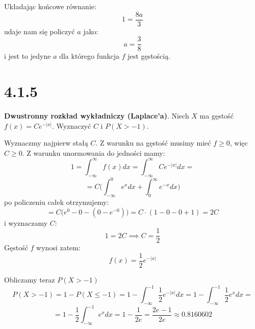 \documentclass{article}
\begin{document}
Układając końcowe równanie:
\begin{equation*}
    1 = \frac{8a}{3}
\end{equation*}
udaje nam się policzyć \(a\) jako:
\begin{equation*}
    a = \frac{3}{8}
\end{equation*}
i jest to jedyne \(a\) dla którego funkcja \(f\) jest gęstością.

\section*{4.1.5}
\begin{center}
    \textbf{Dwustronny rozkład wykładniczy (Laplace'a)}. Niech \(X\) ma gęstość \(f(x) = Ce^{-|x|}\).
    Wyznaczyć \(C\) i \(P(X > -1)\).
\end{center}
Wyznaczmy najpierw stałą \(C\). Z warunku na gęstość musimy mieć \(f \geq 0\), więc \(C \geq 0\). Z warunku unormowania do jedności mamy:
\begin{equation*}
    1 = \int_{-\infty}^{\infty} f(x)dx = \int_{-\infty}^{\infty} Ce^{-|x|} dx = 
\end{equation*}
\begin{equation*}
    = C \Big(\int_{-\infty}^{0} e^{x} dx + \int_{0}^{\infty} e^{-x} dx\Big)
\end{equation*}
po policzeniu całek otrzymujemy:
\begin{equation*}
    = C \Big(e^0 - 0 - (0 - e^{-0})\Big) = C \cdot (1 - 0 - 0 + 1) = 2C
\end{equation*}
i wyznaczamy \(C\):
\begin{equation*}
    1 = 2C \implies C = \frac{1}{2}
\end{equation*}
Gęstość \(f\) wynosi zatem:
\begin{equation*}
    f(x) = \frac{1}{2}e^{-|x|}
\end{equation*}
\par Obliczamy teraz \(P(X > -1)\)
\begin{equation*}
    P(X > -1) = 1 - P(X \leq -1) = 1 - \int_{-\infty}^{-1} \frac{1}{2}e^{-|x|} dx = 1 - \int_{-\infty}^{-1} \frac{1}{2}e^{x} dx = 
\end{equation*}
\begin{equation*}
    = 1 - \frac{1}{2} \int_{-\infty}^{-1} e^{x} dx = 1 - \frac{1}{2e} = \frac{2e - 1}{2e} \approx 0.8160602
\end{equation*}
\end{document}
